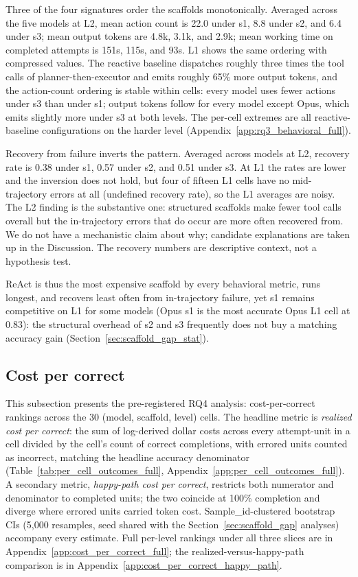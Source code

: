\documentclass[10pt]{article} %
\begin{document}
        Three of the four signatures order the scaffolds monotonically. Averaged across the five models at L2, mean action count is 22.0 under s1, 8.8 under s2, and 6.4 under s3; mean output tokens are 4.8k, 3.1k, and 2.9k; mean working time on completed attempts is 151s, 115s, and 93s. L1 shows the same ordering with compressed values. The reactive baseline dispatches roughly three times the tool calls of planner-then-executor and emits roughly 65\% more output tokens, and the action-count ordering is stable within cells: every model uses fewer actions under s3 than under s1; output tokens follow for every model except Opus, which emits slightly more under s3 at both levels. The per-cell extremes are all reactive-baseline configurations on the harder level (Appendix~\ref{app:rq3_behavioral_full}).
        
        Recovery from failure inverts the pattern. Averaged across models at L2, recovery rate is 0.38 under s1, 0.57 under s2, and 0.51 under s3. At L1 the rates are lower and the inversion does not hold, but four of fifteen L1 cells have no mid-trajectory errors at all (undefined recovery rate), so the L1 averages are noisy. The L2 finding is the substantive one: structured scaffolds make fewer tool calls overall but the in-trajectory errors that do occur are more often recovered from. We do not have a mechanistic claim about why; candidate explanations are taken up in the Discussion. The recovery numbers are descriptive context, not a hypothesis test.
        
        ReAct is thus the most expensive scaffold by every behavioral metric, runs longest, and recovers least often from in-trajectory failure, yet s1 remains competitive on L1 for some models (Opus s1 is the most accurate Opus L1 cell at 0.83): the structural overhead of s2 and s3 frequently does not buy a matching accuracy gain (Section~\ref{sec:scaffold_gap_stat}).
        
    \subsection{Cost per correct}
    \label{sec:cost_per_correct}

        This subsection presents the pre-registered RQ4 analysis: cost-per-correct rankings across the 30 (model, scaffold, level) cells. The headline metric is \emph{realized cost per correct}: the sum of log-derived dollar costs across every attempt-unit in a cell divided by the cell's count of correct completions, with errored units counted as incorrect, matching the headline accuracy denominator (Table~\ref{tab:per_cell_outcomes_full}, Appendix~\ref{app:per_cell_outcomes_full}). A secondary metric, \emph{happy-path cost per correct}, restricts both numerator and denominator to completed units; the two coincide at 100\% completion and diverge where errored units carried token cost. Sample\_id-clustered bootstrap CIs (5{,}000 resamples, seed shared with the Section~\ref{sec:scaffold_gap} analyses) accompany every estimate. Full per-level rankings under all three slices are in Appendix~\ref{app:cost_per_correct_full}; the realized-versus-happy-path comparison is in Appendix~\ref{app:cost_per_correct_happy_path}.
        
\end{document}
